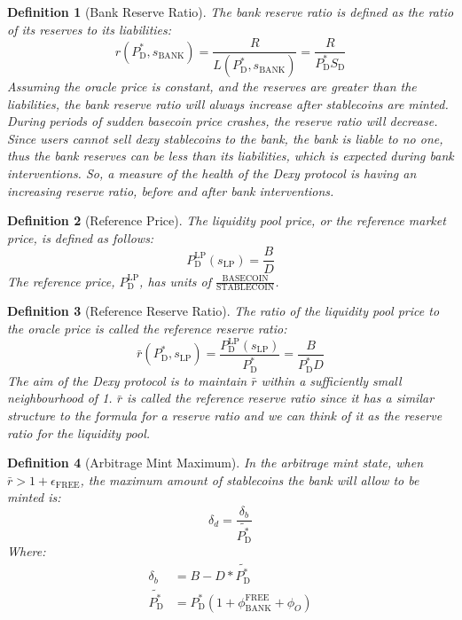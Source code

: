 \documentclass{ifcolog}
\newcommand{\Pdt}{P_{\mathrm{D}}^{*}}
\newcommand{\Plp}{P_{\mathrm{D}}^{\mathrm{LP}}}
\newcommand{\Sd}{S_{\mathrm{D}}}
\newcommand{\rr}{\bar{r}}
\newcommand{\sbank}{s_{\textrm{BANK}}}
\newcommand{\slp}{s_{\mathrm{LP}}}
\newcommand{\epsilonfree}{\epsilon_{\textrm{FREE}}}
\newcommand{\dx}{Dexy}
\newtheorem{definition}{Definition}
\begin{document}
\begin{definition}[Bank Reserve Ratio]
  The bank reserve ratio is defined as the ratio of its reserves to its liabilities:
  \begin{equation}
    r(\Pdt, \sbank) = \frac{R}{L(\Pdt, \sbank)} = \frac{R}{\Pdt \Sd}
  \end{equation}
  Assuming the oracle price is constant, and the reserves are greater than the liabilities,
  the bank reserve ratio will always increase after stablecoins are minted. 
  During periods of sudden basecoin price crashes, the reserve ratio will decrease. 
  Since users cannot sell dexy stablecoins to the bank, the bank is liable to no one, 
  thus the bank reserves can be less than its liabilities, which is expected during bank interventions.
  So, a measure of the health of the \dx{} protocol is having an increasing reserve ratio, 
  before and after bank interventions.
 
\end{definition}

\begin{definition}[Reference Price]
  The liquidity pool price, or the reference market price, is defined as follows:
  \begin{equation}
    \Plp(\slp) = \frac{B}{D}
  \end{equation}
  The reference price, $\Plp$, has units of $\frac{\textrm{BASECOIN}}{\textrm{STABLECOIN}}$.
\end{definition}

\begin{definition}[Reference Reserve Ratio]
    The ratio of the liquidity pool price to the oracle price is called the reference reserve ratio:
\begin{equation}
  \label{eq:r}
  \bar{r}(\Pdt, \slp) = \frac{\Plp(\slp)}{\Pdt} = \frac{B}{\Pdt D}
\end{equation}
  The aim of the \dx{} protocol is to maintain $\rr$ within a sufficiently small neighbourhood of 1.
  $\rr$ is called the reference reserve ratio since it has a similar structure to the formula for a reserve ratio and 
  we can think of it as the reserve ratio for the liquidity pool.
\end{definition}

\begin{definition}[Arbitrage Mint Maximum]
  In the arbitrage mint state, when $\rr > 1 + \epsilonfree$, the maximum amount of stablecoins the bank 
  will allow to be minted is:
\begin{equation}
  \delta_{d} = \frac{\delta_b}{\tilde{\Pdt}}
\end{equation}
  Where:
\begin{align}
  \delta_b &= B - D * \tilde{\Pdt} \\
  \tilde{\Pdt} &= \Pdt(1 + \phi_{\textrm{BANK}}^{\textrm{FREE}} + \phi_{O})
\end{align}
\end{definition}
\end{document}
